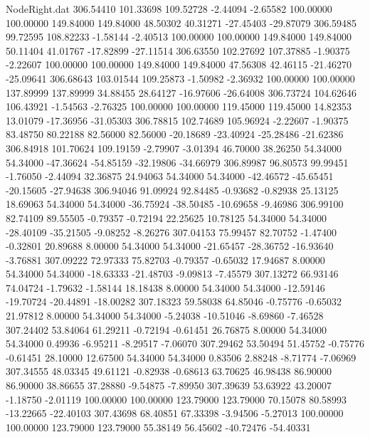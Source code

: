 \begin{filecontents}{NodeRight.dat}
 306.54410  101.33698  109.52728    -2.44094   -2.65582  100.00000  100.00000  149.84000  149.84000   48.50302   40.31271  -27.45403  -29.87079
 306.59485   99.72595  108.82233    -1.58144   -2.40513  100.00000  100.00000  149.84000  149.84000   50.11404   41.01767  -17.82899  -27.11514
 306.63550  102.27692  107.37885    -1.90375   -2.22607  100.00000  100.00000  149.84000  149.84000   47.56308   42.46115  -21.46270  -25.09641
 306.68643  103.01544  109.25873    -1.50982   -2.36932  100.00000  100.00000  137.89999  137.89999   34.88455   28.64127  -16.97606  -26.64008
 306.73724  104.62646  106.43921    -1.54563   -2.76325  100.00000  100.00000  119.45000  119.45000   14.82353   13.01079  -17.36956  -31.05303
 306.78815  102.74689  105.96924    -2.22607   -1.90375   83.48750   80.22188   82.56000   82.56000  -20.18689  -23.40924  -25.28486  -21.62386
 306.84918  101.70624  109.19159    -2.79907   -3.01394   46.70000   38.26250   54.34000   54.34000  -47.36624  -54.85159  -32.19806  -34.66979
 306.89987   96.80573   99.99451    -1.76050   -2.44094   32.36875   24.94063   54.34000   54.34000  -42.46572  -45.65451  -20.15605  -27.94638
 306.94046   91.09924   92.84485    -0.93682   -0.82938   25.13125   18.69063   54.34000   54.34000  -36.75924  -38.50485  -10.69658   -9.46986
 306.99100   82.74109   89.55505    -0.79357   -0.72194   22.25625   10.78125   54.34000   54.34000  -28.40109  -35.21505   -9.08252   -8.26276
 307.04153   75.99457   82.70752    -1.47400   -0.32801   20.89688    8.00000   54.34000   54.34000  -21.65457  -28.36752  -16.93640   -3.76881
 307.09222   72.97333   75.82703    -0.79357   -0.65032   17.94687    8.00000   54.34000   54.34000  -18.63333  -21.48703   -9.09813   -7.45579
 307.13272   66.93146   74.04724    -1.79632   -1.58144   18.18438    8.00000   54.34000   54.34000  -12.59146  -19.70724  -20.44891  -18.00282
 307.18323   59.58038   64.85046    -0.75776   -0.65032   21.97812    8.00000   54.34000   54.34000   -5.24038  -10.51046   -8.69860   -7.46528
 307.24402   53.84064   61.29211    -0.72194   -0.61451   26.76875    8.00000   54.34000   54.34000    0.49936   -6.95211   -8.29517   -7.06070
 307.29462   53.50494   51.45752    -0.75776   -0.61451   28.10000   12.67500   54.34000   54.34000    0.83506    2.88248   -8.71774   -7.06969
 307.34555   48.03345   49.61121    -0.82938   -0.68613   63.70625   46.98438   86.90000   86.90000   38.86655   37.28880   -9.54875   -7.89950
 307.39639   53.63922   43.20007    -1.18750   -2.01119  100.00000  100.00000  123.79000  123.79000   70.15078   80.58993  -13.22665  -22.40103
 307.43698   68.40851   67.33398    -3.94506   -5.27013  100.00000  100.00000  123.79000  123.79000   55.38149   56.45602  -40.72476  -54.40331

\end{filecontents}

